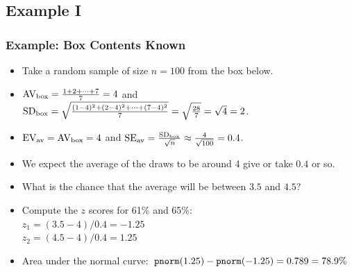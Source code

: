 \documentclass[t]{beamer}
\begin{document}
\subsection{Example I}
\begin{frame}
\frametitle{Example:  Box Contents Known}

\footnotesize

\begin{itemize}
\item<2-> Take a random sample of size $n=100$ from the box below.
\begin{center}
\end{center}
\item<3-> $\mbox{AV}_{\mbox{\scriptsize box}}=\frac{1+2+\cdots + 7}{7} =4$
and $\mbox{SD}_{\mbox{\scriptsize box}}=\sqrt{\frac{(1-4)^2+(2-4)^2+\cdots + (7-4)^2}{7}}=\sqrt{\frac{28}{7}}=\sqrt{4}=2$.
\item<4-> $\mbox{EV}_{\mbox{\scriptsize av}}=\mbox{AV}_{\mbox{\scriptsize box}}=4$
 and $\mbox{SE}_{\mbox{\scriptsize av}}=
    \frac{\footnotesize\mbox{\scriptsize SD}_{\mbox{\tiny box}}}{\sqrt{n}}\approx 
    \frac{4}{\sqrt{100}} = 0.4$.
\item<5-> We expect the average of the draws to be around 4 give or take $0.4$ or so.
\item<6-> What is the chance that the average will be between $3.5$ and $4.5$?
\item<7-> Compute the $z$ scores for 61\% and 65\%:\\
   $z_1=(3.5 - 4)/0.4 = -1.25$\\[2pt]
   $z_2=(4.5 - 4)/0.4 = 1.25$\\
\item<8->  Area under the normal curve:~{\scriptsize $\mbox{\texttt{pnorm}}(1.25) - \mbox{\texttt{pnorm}}(-1.25) = 
   0.789=78.9\%$}
\end{itemize}

\end{frame}
\end{document}
